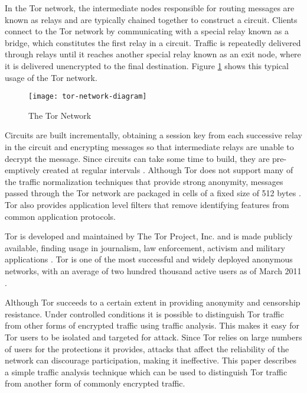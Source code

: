 \documentclass{ecuthesis}
\begin{document}
In the Tor network, the intermediate nodes responsible for routing messages are
known as relays and are typically chained together to construct a circuit.
Clients connect to the Tor network by communicating with a special relay known
as a bridge, which constitutes the first relay in a circuit. Traffic is
repeatedly delivered through relays until it reaches another special relay known
as an exit node, where it is delivered unencrypted to the final destination.
Figure \ref{tor-network} shows this typical usage of the Tor network.

\begin{figure}[H]
  \centering\texttt{[image: tor-network-diagram]}
  \caption{The Tor Network}
  \label{tor-network}
\end{figure}

Circuits are built incrementally, obtaining a session key from each
successive relay in the circuit and encrypting messages so that intermediate
relays are unable to decrypt the message. Since circuits can take some time to
build, they are pre-emptively created at regular intervals
\parencite[5]{Dingledine:2004p314}. Although Tor does not support many of the
traffic normalization techniques that provide strong anonymity, messages passed
through the Tor network are packaged in cells of a fixed size of 512 bytes
\parencite[5]{Dingledine:2004p314}. Tor also provides application level filters
that remove identifying features from common application protocols.

Tor is developed and maintained  by The Tor Project, Inc. and is made publicly
available, finding usage in journalism, law enforcement, activism and military
applications \parencite{The-Tor-Project-Inc.:2011uq}. Tor is one of the most
successful and widely deployed anonymous networks, with an average of two
hundred thousand active users as of March 2011
\parencite{The-Tor-Project-Inc.:2011fk}.

Although Tor succeeds to a certain extent in providing anonymity and censorship
resistance. Under controlled conditions it is possible to distinguish Tor
traffic from other forms of encrypted traffic using traffic analysis. This makes
it easy for Tor users to be isolated and targeted for attack. Since Tor relies
on large numbers of users for the protections it provides, attacks that affect
the reliability of the network can discourage participation, making it
ineffective. This paper describes a simple traffic analysis technique which can
be used to distinguish Tor traffic from another form of commonly encrypted
traffic.
\end{document}
